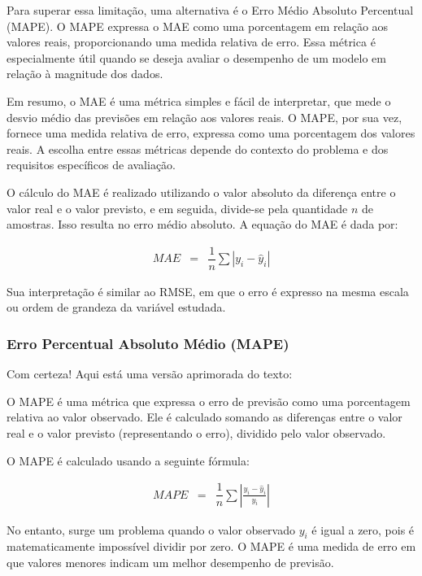 Para superar essa limitação, uma alternativa é o Erro Médio Absoluto Percentual (MAPE). O MAPE expressa o MAE como uma porcentagem em relação aos valores reais, proporcionando uma medida relativa de erro. Essa métrica é especialmente útil quando se deseja avaliar o desempenho de um modelo em relação à magnitude dos dados.

Em resumo, o MAE é uma métrica simples e fácil de interpretar, que mede o desvio médio das previsões em relação aos valores reais. O MAPE, por sua vez, fornece uma medida relativa de erro, expressa como uma porcentagem dos valores reais. A escolha entre essas métricas depende do contexto do problema e dos requisitos específicos de avaliação.

O cálculo do MAE é realizado utilizando o valor absoluto da diferença entre o valor real e o valor previsto, e em seguida, divide-se pela quantidade $n$ de amostras. Isso resulta no erro médio absoluto. A equação do MAE é dada por:

\begin{eqnarray}
	M A E &=& \dfrac{1}{n} \sum\left|y_i-\hat{y}_i\right|\label{eq:mae}
\end{eqnarray}

Sua interpretação é similar ao RMSE, em que o erro é expresso na mesma escala ou ordem de grandeza da variável estudada.

\subsubsection{Erro Percentual Absoluto M\'edio (MAPE)}

Com certeza! Aqui está uma versão aprimorada do texto:

O MAPE é uma métrica que expressa o erro de previsão como uma porcentagem relativa ao valor observado. Ele é calculado somando as diferenças entre o valor real e o valor previsto (representando o erro), dividido pelo valor observado.

O MAPE é calculado usando a seguinte fórmula:

\begin{eqnarray}
	MAPE &=& \dfrac{1}{n} \sum\left|\frac{y_i - \hat{y}_i}{y_i}\right|\label{eq:mape}
\end{eqnarray}

No entanto, surge um problema quando o valor observado $y_i$ é igual a zero, pois é matematicamente impossível dividir por zero. O MAPE é uma medida de erro em que valores menores indicam um melhor desempenho de previsão.

